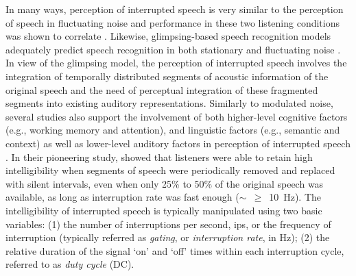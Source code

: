 \documentclass[a4paper, twoside]{templates/ociamthesis}
\begin{document}
In many ways, perception of interrupted speech is very similar to the perception of speech in fluctuating noise and performance in these two listening conditions was shown to correlate \autocite{Buss2009,Grose2016}. Likewise, glimpsing-based speech recognition models adequately predict speech recognition in both stationary and fluctuating noise \autocite{Cooke2006,Rhebergen2006}. In view of the glimpsing model, the perception of interrupted speech involves the integration of temporally distributed segments of acoustic information of the original speech and the need of perceptual integration of these fragmented segments into existing auditory representations. Similarly to modulated noise, several studies also support the involvement of both higher-level cognitive factors (e.g., working memory and attention), and linguistic factors (e.g., semantic and context) as well as lower-level auditory factors in perception of interrupted speech \autocite{Miller1950,Kidd2012,Baskent2016}. In their pioneering study, \textcite{Miller1950} showed that listeners were able to retain high intelligibility when segments of speech were periodically removed and replaced with silent intervals, even when only 25\% to 50\% of the original speech was available, as long as interruption rate was fast enough (\(\sim\)~\(\geq\)~10~Hz). The intelligibility of interrupted speech is typically manipulated using two basic variables: (1) the number of interruptions per second, ips, or the frequency of interruption (typically referred as \textit{gating}, or \textit{interruption rate}, in Hz); (2) the relative duration of the signal `on' and `off' times within each interruption cycle, referred to as \textit{duty cycle} (DC).\\
\end{document}
